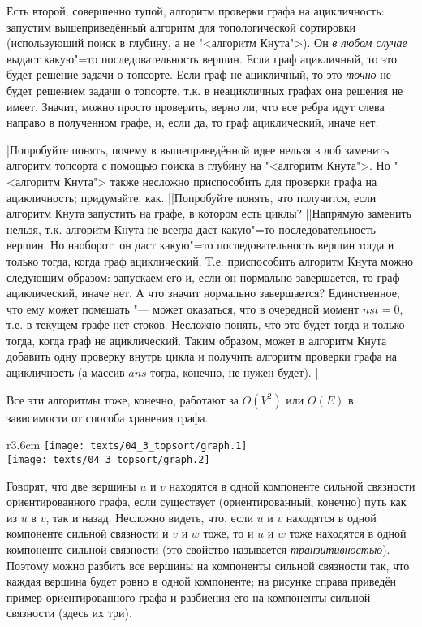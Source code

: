 Есть второй, совершенно тупой, алгоритм проверки графа на ацикличность: запустим 
вышеприведённый алгоритм для топологической сортировки (использующий поиск в глубину, а не 
"<алгоритм Кнута">). Он \textit{в любом случае} выдаст какую"=то последовательность вершин. Если 
граф ацикличный, то это будет решение задачи о топсорте. Если граф не ацикличный, то это 
\textit{точно} не будет решением задачи о топсорте, т.к. в неацикличных графах она решения не 
имеет. Значит, можно просто проверить, верно ли, что все ребра идут слева направо в полученном 
графе, и, если да, то граф ациклический, иначе нет.

\task|Попробуйте понять, почему в вышеприведённой идее нельзя в лоб заменить алгоритм топсорта с 
помощью поиска в глубину на "<алгоритм Кнута">. Но "<алгоритм Кнута"> также несложно приспособить 
для проверки графа на ацикличность; придумайте, как.
||Попробуйте понять, что получится, если алгоритм Кнута запустить 
на графе, в котором есть циклы?
||Напрямую заменить нельзя, т.к. алгоритм Кнута не всегда даст какую"=то последовательность
вершин. Но наоборот: он даст какую"=то последовательность вершин тогда и только тогда, когда граф ациклический.
Т.е. приспособить алгоритм Кнута можно следующим образом: запускаем его и, если он нормально завершается, то
граф ациклический, иначе нет. А что значит нормально завершается? Единственное, что ему может помешать "---
может оказаться, что в очередной момент $nst=0$, т.е. в текущем графе нет стоков. Несложно понять, что это
будет тогда и только тогда, когда граф не ациклический. Таким образом, может в алгоритм Кнута добавить одну проверку
внутрь цикла и получить алгоритм проверки графа на ацикличность (а массив $ans$ тогда, конечно, не нужен будет).
|\label{Knuthforacycliccheck}

Все эти алгоритмы тоже, конечно, работают за $O(V^2)$ или $O(E)$ в зависимости от способа хранения 
графа.

\begin{wrapfigure}[1]{r}{3.6cm}
\vspace{-0.3cm}
\texttt{[image: texts/04\_3\_topsort/graph.1]}\\[0.2cm]
\texttt{[image: texts/04\_3\_topsort/graph.2]}
\end{wrapfigure}

Говорят, что две вершины $u$ и $v$ находятся в одной компоненте сильной связности ориентированного графа, 
если существует (ориентированный, конечно) путь как из $u$ в $v$, так и назад. Несложно видеть, что, если $u$ и $v$ 
находятся в одной компоненте сильной связности и $v$ и $w$ тоже, то и $u$ и $w$ тоже находятся в одной компоненте 
сильной связности (это свойство называется \textit{транзитивностью}). Поэтому можно разбить все
вершины на компоненты сильной связности так, что каждая вершина будет ровно в одной компоненте; на
рисунке справа приведён пример ориентированного графа и разбиения его на компоненты сильной
связности (здесь их три).


